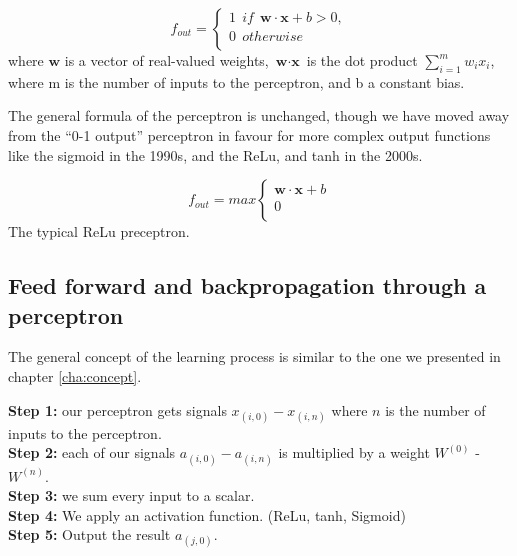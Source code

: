 \begin{equation}
    \label{eq:tresh}
 f_{out}=   \left\{
\begin{array}{ll}
		1 \ \ if \ \ \textbf{w} \cdot \textbf{x} + b > 0, \\
     	0 \ \ otherwise \\
\end{array} 
\right. 
\end{equation}
where $\textbf{w}$  is a vector of real-valued weights, $\textbf{w} \cdot \textbf{x}$ is the dot product $\sum _{i=1}^{m}w_{i}x_{i}$, where m is the number of inputs to the perceptron, and b a constant bias. 


The general formula of the perceptron is unchanged, though we have moved away from the ``0-1 output'' perceptron in favour for more complex output functions like the sigmoid in the 1990s, and the ReLu, and tanh in the 2000s. 

\begin{equation}
    \label{eq:ReLu}
 f_{out}=   max\left\{
\begin{array}{ll}
		\textbf{w} \cdot \textbf{x} + b \\
     	0 \\
\end{array} 
\right. 
\end{equation}
The typical ReLu preceptron.



\subsection{Feed forward and backpropagation through a perceptron}
The general concept of the learning process is similar to the one we presented in chapter \ref{cha:concept}.

\noindent \textbf{Step 1:} our perceptron gets signals $x_{(i,0)}-x_{(i,n)}$ where $n$ is the number of inputs to the perceptron.\\

\noindent \textbf{Step 2:} each of our signals $a_{(i,0)}-a_{(i,n)}$ is multiplied by a weight $W^{(0)}$ -  $W^{(n)}$. \\

\noindent \textbf{Step 3:} we sum every input to a scalar. \\

\noindent \textbf{Step 4:} We apply an activation function. (ReLu, tanh, Sigmoid)\\

\noindent \textbf{Step 5:} Output the result $a_{(j,0)}$.\\

